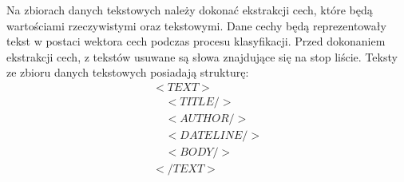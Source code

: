 \documentclass{classrep}
\begin{document}
Na zbiorach danych tekstowych należy dokonać ekstrakcji cech, które będą wartościami rzeczywistymi oraz tekstowymi. Dane cechy będą reprezentowały tekst w postaci wektora cech podczas procesu klasyfikacji. Przed dokonaniem ekstrakcji cech, z tekstów usuwane są słowa znajdujące się na stop liście. Teksty ze zbioru danych tekstowych posiadają strukturę: \begin{equation}
  \begin{array}{l}
  <TEXT> \\
\;\;\;\; <TITLE/>\\
\;\;\;\; <AUTHOR/>\\
\;\;\;\; <DATELINE/>\\
 \;\;\;\;<BODY/> \\
</TEXT>
  \end{array}
\end{equation}\\
\end{document}
